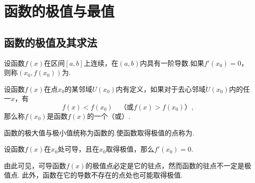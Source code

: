 \section{函数的极值与最值}
\subsection{函数的极值及其求法}
\begin{definition}[驻点]
设函数\(f(x)\)在区间\([a,b]\)上连续，在\((a,b)\)内具有一阶导数.如果\(f'(x_0)=0\)，则称\((x_0,f(x_0))\)为.
\end{definition}

\begin{definition}[极值点]
设函数\(f(x)\)在点\(x_0\)的某邻域\(U(x_0)\)内有定义，如果对于去心邻域\(\mathring{U}(x_0)\)内的任一\(x\)，有\[
f(x)<f(x_0) \quad \text{（或}f(x)>f(x_0)\text{）},
\]那么称\(f(x_0)\)是函数\(f(x)\)的一个（或）.

函数的极大值与极小值统称为函数的.使函数取得极值的点称为.
\end{definition}

\begin{theorem}[函数存在极值的必要条件]\label{theorem:微分中值定理.函数存在极值的必要条件}
设函数\(f(x)\)在\(x_0\)处可导，且在\(x_0\)取得极值，那么\(f'(x_0)=0\).
\end{theorem}
由此可见，可导函数\(f(x)\)的极值点必定是它的驻点，然而函数的驻点不一定是极值点.
此外，函数在它的导数不存在的点处也可能取得极值.

